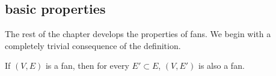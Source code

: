 
\subsection{basic properties}

The rest of the chapter develops the properties of fans.  We begin with
a completely trivial consequence of the definition.

\begin{lemma}[]\label{lemma:subset-fan}
If $(V,E)$ is a fan, then for every $E'\subset E$, $(V,E')$ is also
a fan.
\end{lemma}


